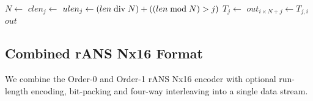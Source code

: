 \documentclass[a4paper]{article}
\begin{document}


\vskip 0.5cm

\begin{algorithmic}[1]
  \State $N \gets $
   
    \State $clen_j \gets $
  \EndFor
  \Statex
   
    \State $ulen_j \gets (len \bdiv N) + ((len \bmod N) > j)$
    \State $T_j \gets $
  \EndFor
  \Statex
   
      \State $out_{i \times N + j} \gets T_{j,i}$
    \EndFor
  \EndFor
  \State \Return $out$
\EndFunction
\end{algorithmic}

\subsection{Combined rANS Nx16 Format}

We combine the Order-0 and Order-1 rANS Nx16 encoder with optional
run-length encoding, bit-packing and four-way interleaving into a
single data stream.

%
%
\end{document}
